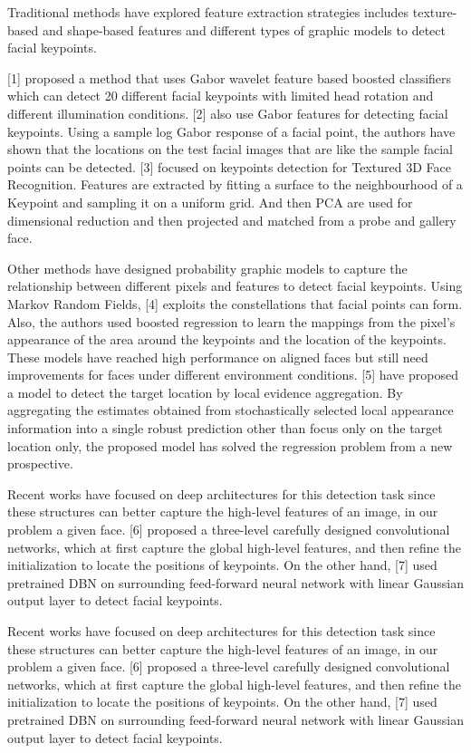 \documentclass[conference]{IEEEtran}
\begin{document}
Traditional methods have explored feature extraction strategies includes texture-based and shape-based features and different types of graphic models to detect facial keypoints.  

[1] proposed a method that uses Gabor wavelet feature based boosted classifiers which can detect 20 different facial keypoints with limited head rotation and different illumination conditions. [2] also use Gabor features for detecting facial keypoints. Using a sample log Gabor response of a facial point, the authors have shown that the locations on the test facial images that are like the sample facial points can be detected. [3] focused on keypoints detection for Textured 3D Face Recognition. Features are extracted by fitting a surface to the neighbourhood of a Keypoint and sampling it on a uniform grid. And then PCA are used for dimensional reduction and then projected and matched from a probe and gallery face.

Other methods have designed probability graphic models to capture the relationship between different pixels and features to detect facial keypoints. Using Markov Random Fields, [4] exploits the constellations that facial points can form. Also, the authors used boosted regression to learn the mappings from the pixel’s appearance of the area around the keypoints and the location of the keypoints. These models have reached high performance on aligned faces but still need improvements for faces under different environment conditions. [5] have proposed a model to detect the target location by local evidence aggregation. By aggregating the estimates obtained from stochastically selected local appearance information into a single robust prediction other than focus only on the target location only, the proposed model has solved the regression problem from a new prospective.

Recent works have focused on deep architectures for this detection task since these structures can better capture the high-level features of an image, in our problem a given face. [6] proposed a three-level carefully designed convolutional networks, which at first capture the global high-level features, and then refine the initialization to locate the positions of keypoints. On the other hand, [7] used pretrained DBN on surrounding feed-forward neural network with linear Gaussian output layer to detect facial keypoints. 

Recent works have focused on deep architectures for this detection task since these structures can better capture the high-level features of an image, in our problem a given face. [6] proposed a three-level carefully designed convolutional networks, which at first capture the global high-level features, and then refine the initialization to locate the positions of keypoints. On the other hand, [7] used pretrained DBN on surrounding feed-forward neural network with linear Gaussian output layer to detect facial keypoints. 
\end{document}
